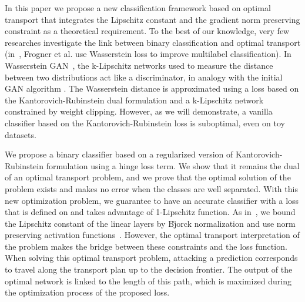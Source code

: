 In this paper we propose a new classification framework based on optimal transport that integrates the Lipschitz constant and the gradient norm preserving constraint as a theoretical requirement. To the best of our knowledge, very few researches investigate the link between binary classification and optimal transport (in~\cite{Frogner2015}, Frogner et al. use Wasserstein loss to improve multilabel classification). In Wasserstein GAN~\cite{Arjovsky2017}, the k-Lipschitz networks used to measure the distance between two distributions act like a discriminator, in analogy with the initial GAN algorithm \cite{Goodfellow2014}. The Wasserstein distance is approximated using a loss based on the Kantorovich-Rubinstein dual formulation and a k-Lipschitz network constrained by weight clipping. However, as we will demonstrate, a vanilla classifier based on the Kantorovich-Rubinstein loss is suboptimal, even on toy datasets.

We propose a binary classifier based on a regularized version of Kantorovich-Rubinstein formulation using a hinge loss term. We show that it remains the dual of an optimal transport problem, and we prove that the optimal solution of the problem exists and makes no error when the classes are well separated. With this new optimization problem, we guarantee to have an accurate classifier with a loss that is defined on and takes advantage of 1-Lipschitz function. As in~\cite{li2019preventing}, we bound the Lipschitz constant of the linear layers by B\"jorck normalization and use norm preserving activation functions~\cite{pmlr-v97-anil19a}. However, the optimal transport interpretation of the problem makes the bridge between these constraints and the loss function. When solving this optimal transport problem, attacking a prediction corresponds to travel along the transport plan up to the decision frontier. The output of the optimal network is linked to the length of this path, which is maximized during the optimization process of the proposed loss. 


